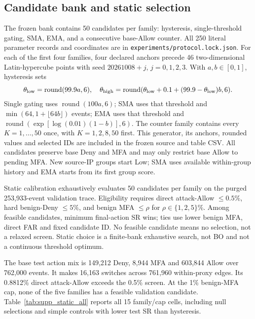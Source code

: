 \documentclass[10pt,onecolumn]{IEEEtran}
\begin{document}
\subsection{Candidate bank and static selection}
The frozen bank contains 50 candidates per family:
hysteresis, single-threshold gating, SMA, EMA, and a
consecutive base-Allow counter. All 250 literal parameter
records and coordinates are in
\texttt{experiments/protocol.lock.json}. For each of the
first four families, four declared anchors precede 46
two-dimensional Latin-hypercube points with seed
\(20261008+j\), \(j=0,1,2,3\). With \(a,b\in[0,1]\),
hysteresis sets
\[
 \theta_{\rm low}=\operatorname{round}(99.9a,6),\quad
 \theta_{\rm high}=\operatorname{round}
 (\theta_{\rm low}+0.1+(99.9-\theta_{\rm low})b,6).
\]
Single gating uses \(\operatorname{round}(100a,6)\);
SMA uses that threshold and
\(\min(64,1+\lfloor64b\rfloor)\) events;
EMA uses that threshold and
\(\operatorname{round}(\exp[\log(0.01)(1-b)],6)\).
The counter family contains every \(K=1,\ldots,50\)
once, with \(K=1,2,8,50\) first. This generator,
its anchors, rounded values and selected IDs are
included in the frozen source and table CSV.
All candidates preserve base Deny and MFA and may
only restrict base Allow to pending MFA. New source-IP
groups start Low; SMA uses available within-group
history and EMA starts from its first group score.

Static calibration exhaustively evaluates 50 candidates
per family on the purged 253,933-event validation
trace. Eligibility requires direct attack-Allow
\(\le0.5\%\), hard benign-Deny \(\le5\%\), and
benign MFA \(\le\rho\) for
\(\rho\in\{1,2,5\}\%\).
Among feasible candidates, minimum final-action SR
wins; ties use lower benign MFA, direct FAR and
fixed candidate ID. No feasible candidate means
no selection, not a relaxed screen. Static choice
is a finite-bank exhaustive search, not BO and
not a continuous threshold optimum.

The base test action mix is 149,212 Deny,
8,944 MFA and 603,844 Allow over 762,000 events.
It makes 16,163 switches across 761,960 within-proxy
edges. Its 0.8812\% direct attack-Allow exceeds
the 0.5\% screen. At the 1\% benign-MFA cap,
none of the five families has a feasible validation
candidate. Table~\ref{tab:supp_static_all} reports
all 15 family/cap cells, including null selections
and simple controls with lower test SR than hysteresis.

\end{document}
